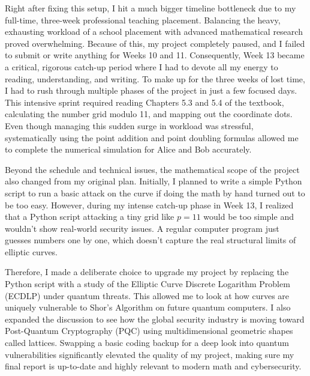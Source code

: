 \documentclass[11pt,a4paper]{article}
\begin{document}
Right after fixing this setup, I hit a much bigger timeline bottleneck due to my full-time, three-week professional teaching placement. Balancing the heavy, exhausting workload of a school placement with advanced mathematical research proved overwhelming. Because of this, my project completely paused, and I failed to submit or write anything for Weeks 10 and 11. Consequently, Week 13 became a critical, rigorous catch-up period where I had to devote all my energy to reading, understanding, and writing. To make up for the three weeks of lost time, I had to rush through multiple phases of the project in just a few focused days. This intensive sprint required reading Chapters 5.3 and 5.4 of the textbook, calculating the number grid modulo 11, and mapping out the coordinate dots. Even though managing this sudden surge in workload was stressful, systematically using the point addition and point doubling formulas allowed me to complete the numerical simulation for Alice and Bob accurately.

Beyond the schedule and technical issues, the mathematical scope of the project also changed from my original plan. Initially, I planned to write a simple Python script to run a basic attack on the curve if doing the math by hand turned out to be too easy. However, during my intense catch-up phase in Week 13, I realized that a Python script attacking a tiny grid like $p=11$ would be too simple and wouldn't show real-world security issues. A regular computer program just guesses numbers one by one, which doesn't capture the real structural limits of elliptic curves.

Therefore, I made a deliberate choice to upgrade my project by replacing the Python script with a study of the Elliptic Curve Discrete Logarithm Problem (ECDLP) under quantum threats. This allowed me to look at how curves are uniquely vulnerable to Shor's Algorithm on future quantum computers. I also expanded the discussion to see how the global security industry is moving toward Post-Quantum Cryptography (PQC) using multidimensional geometric shapes called lattices. Swapping a basic coding backup for a deep look into quantum vulnerabilities significantly elevated the quality of my project, making sure my final report is up-to-date and highly relevant to modern math and cybersecurity.
\end{document}
